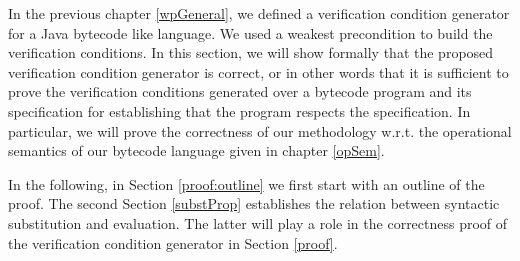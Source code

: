  In the previous chapter \ref{wpGeneral}, we defined a verification
 condition generator for a Java bytecode like language. We used a weakest precondition
 to build the verification conditions. In this section, we will show formally that the
 proposed verification condition generator is correct, or in other words that it is sufficient
 to prove the verification conditions generated over a bytecode program and its specification 
 for establishing that the program respects the specification. 
 In particular, we will prove the correctness of our methodology w.r.t. the operational semantics of our bytecode language
 given in chapter \ref{opSem}. 

 In the following, in Section \ref{proof:outline} we first start with an outline of the proof.   
 The second Section \ref{substProp} establishes the relation between syntactic substitution  and evaluation.
 The latter will play a role in the correctness proof  of the verification condition generator
 in Section  \ref{proof}.
  



